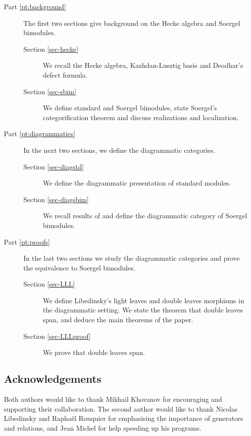 \begin{description}
\item[Part \ref{pt:background}] The first two sections give background on the Hecke algebra and Soergel bimodules.
\begin{description}
  \item[Section \ref{sec-hecke}] We recall the Hecke algebra, Kazhdan-Lusztig basis and Deodhar's defect formula.
  \item[Section \ref{sec-sbim}] We define standard and Soergel bimodules, state Soergel's categorification theorem and discuss realizations and localization.
\end{description}
\item[Part \ref{pt:diagrammatics}] In the next two sections, we define the diagrammatic categories.
 \begin{description}
 \item[Section \ref{sec-diagstd}] We define the diagrammatic presentation of standard modules.
 \item[Section \ref{sec-diagsbim}] We recall results of \cite{EDihedral} and define the diagrammatic category of Soergel bimodules.
  \end{description}
\item[Part \ref{pt:proofs}] In the last two sections we study the diagrammatic categories and prove the equivalence to Soergel bimodules.
\begin{description}
  \item[Section \ref{sec-LLL}] We define Libedinsky's light leaves and double leaves morphisms in the diagrammatic setting. We state the theorem that double leaves span, and deduce the main theorems of the paper.
\item[Section \ref{sec-LLLproof}] We prove that double leaves span.
  \end{description}

\end{description}

\subsection{Acknowledgements} Both authors would like to thank Mikhail Khovanov for encouraging and supporting their collaboration. The second author would like to thank Nicolas Libedinsky and Rapha\"el Rouquier for emphasising the importance of generators and relations, and Jean Michel for help speeding up his programs.